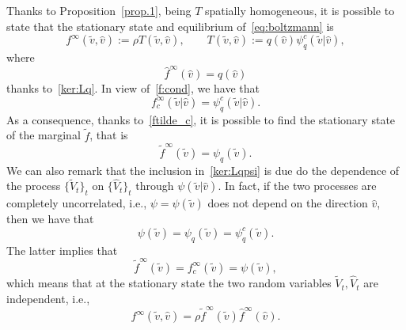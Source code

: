 \documentclass[a4paper]{article}
\theoremstyle{Theorem}\newtheorem{proposition}{Proposition}[section]
\theoremstyle{Remark}\newtheorem{remark}{Remark}[section]
\theoremstyle{Theorem}\newtheorem{theorem}{Theorem}[section]
\newcommand{\hv}{\hat{v}}
\newcommand{\tv}{\tilde{v}}
\newcommand{\hf}{\hat{f}}
\newcommand{\tf}{\tilde{f}}
\newcommand{\hV}{\hat{V}}
\newcommand{\tV}{\tilde{V}}
\begin{document}
Thanks to Proposition~\ref{prop.1}, being $T$ spatially homogeneous, it is possible to state that the stationary state and equilibrium of~\eqref{eq:boltzmann} is
\begin{equation*}
    f^{\infty}(\tv,\hv) := \rho T(\tv, \hv), \qquad T(\tv,\hv) := q(\hv) \psi_q^c(\tv|\hv),
\end{equation*}
where
\begin{equation}\label{hf.infty}
    \hf^\infty(\hv) =q(\hv)
\end{equation}
thanks to~\eqref{ker:Lq}.
In view of~\eqref{f:cond}, we have that 
\begin{equation}\label{fc.infty}
    f_c^{\infty}(\tv|\hv) = \psi_q^c(\tv|\hv).
\end{equation}
As a consequence, thanks to~\eqref{ftilde_c}, it is possible to find the stationary state of the marginal $\tf$, that is
\begin{equation}\label{tf.infty}
    \tf^\infty(\tv) = \psi_q(\tv).
\end{equation}
We can also remark that the inclusion in~\eqref{ker:Lqpsi} is due do the dependence of the process $\lbrace \tV_t \rbrace_t$ on $\lbrace\hV_t \rbrace_t$ through $\psi(\tv|\hv)$. In fact, if the two processes are completely uncorrelated, i.e., $\psi=\psi(\tv)$ does not depend on the direction $\hv$, then we have that
\begin{equation}\label{psiv.1}
    \psi(\tv) = \psi_q(\tv) = \psi_q^c(\tv).
\end{equation}
The latter implies that
\begin{equation}\label{psiv.2}
    \tf^\infty(\tv) =f^\infty_c(\tv) = \psi(\tv),
\end{equation}
which means that at the stationary state the two random variables $\tV_t, \hV_t$ are independent, i.e.,
\begin{equation}\label{f.indep}
f^\infty(\tv, \hv) = \rho\tf^\infty(\tv) \hf^\infty (\hv).
\end{equation}
\end{document}
